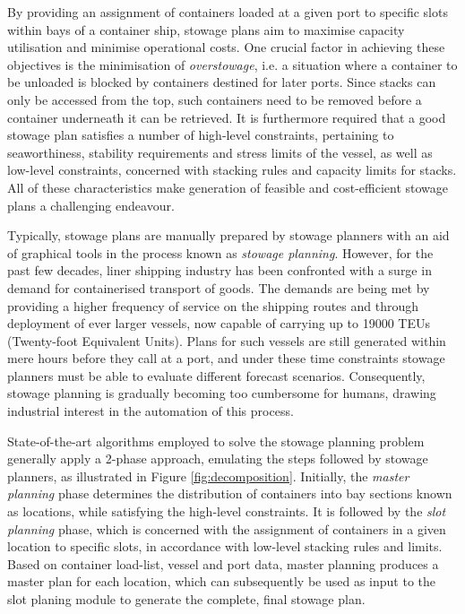\documentclass[preprint,12pt,3p]{elsarticle}
\begin{document}
By providing an assignment of containers loaded at a given port to specific slots within bays of a container ship, stowage plans aim to maximise capacity utilisation and minimise operational costs. One crucial factor in achieving these objectives is the minimisation of \textit{overstowage}, i.e. a situation where a container to be unloaded is blocked by containers destined for later ports. Since stacks can only be accessed from the top, such containers need to be removed before a container underneath it can be retrieved. It is furthermore required that a good stowage plan satisfies a number of high-level constraints, pertaining to seaworthiness, stability requirements and stress limits of the vessel, as well as low-level constraints, concerned with stacking rules and capacity limits for stacks. All of these characteristics make generation of feasible and cost-efficient stowage plans a challenging endeavour.

Typically, stowage plans are manually prepared by stowage planners with an aid of graphical tools in the process known as \textit{stowage planning}. However, for the past few decades, liner shipping industry has been confronted with a surge in demand for containerised transport of goods. The demands are being met by providing a higher frequency of service on the shipping routes and through deployment of ever larger vessels, now capable of carrying up to 19000 TEUs (Twenty-foot Equivalent Units). Plans for such vessels are still generated within mere hours before they call at a port, and under these time constraints stowage planners must be able to evaluate different forecast scenarios. Consequently, stowage planning is gradually becoming too cumbersome for humans, drawing industrial interest in the automation of this process.

State-of-the-art algorithms employed to solve the stowage planning problem generally apply a 2-phase approach, emulating the steps followed by stowage planners, as illustrated in Figure \ref{fig:decomposition}. Initially, the \textit{master planning} phase determines the distribution of containers into bay sections known as locations, while satisfying the high-level constraints. It is followed by the \textit{slot planning} phase, which is concerned with the assignment of containers in a given location to specific slots, in accordance with low-level stacking rules and limits. Based on container load-list, vessel and port data, master planning produces a master plan for each location, which can subsequently be used as input to the slot planing module to generate the complete, final stowage plan.
\end{document}
